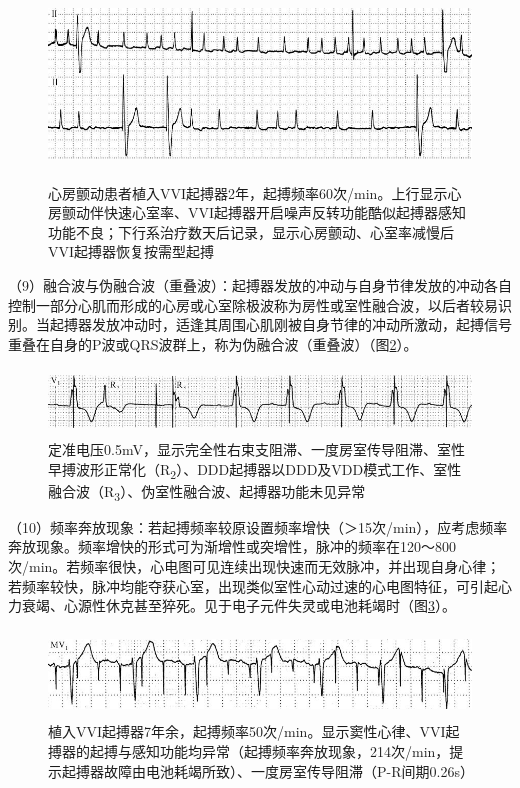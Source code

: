 \begin{figure}[!htbp]
 \centering
 \includegraphics[width=5.58333in,height=1.98958in]{./images/Image00609.jpg}
 \captionsetup{justification=centering}
 \caption{心房颤动患者植入VVI起搏器2年，起搏频率60次/min。上行显示心房颤动伴快速心室率、VVI起搏器开启噪声反转功能酷似起搏器感知功能不良；下行系治疗数天后记录，显示心房颤动、心室率减慢后VVI起搏器恢复按需型起搏}
 \label{fig38-6}
  \end{figure} 

（9）融合波与伪融合波（重叠波）：起搏器发放的冲动与自身节律发放的冲动各自控制一部分心肌而形成的心房或心室除极波称为房性或室性融合波，以后者较易识别。当起搏器发放冲动时，适逢其周围心肌刚被自身节律的冲动所激动，起搏信号重叠在自身的P波或QRS波群上，称为伪融合波（重叠波）（图\ref{fig38-7}）。

\begin{figure}[!htbp]
 \centering
 \includegraphics[width=5.58333in,height=0.69792in]{./images/Image00610.jpg}
 \captionsetup{justification=centering}
 \caption{定准电压0.5mV，显示完全性右束支阻滞、一度房室传导阻滞、室性早搏波形正常化（R\textsubscript{2}）、DDD起搏器以DDD及VDD模式工作、室性融合波（R\textsubscript{3}）、伪室性融合波、起搏器功能未见异常}
 \label{fig38-7}
  \end{figure} 


（10）频率奔放现象：若起搏频率较原设置频率增快（＞15次/min），应考虑频率奔放现象。频率增快的形式可为渐增性或突增性，脉冲的频率在120～800次/min。若频率很快，心电图可见连续出现快速而无效脉冲，并出现自身心律；若频率较快，脉冲均能夺获心室，出现类似室性心动过速的心电图特征，可引起心力衰竭、心源性休克甚至猝死。见于电子元件失灵或电池耗竭时（图\ref{fig38-8}）。

\begin{figure}[!htbp]
 \centering
 \includegraphics[width=5.58333in,height=0.91667in]{./images/Image00611.jpg}
 \captionsetup{justification=centering}
 \caption{植入VVI起搏器7年余，起搏频率50次/min。显示窦性心律、VVI起搏器的起搏与感知功能均异常（起搏频率奔放现象，214次/min，提示起搏器故障由电池耗竭所致）、一度房室传导阻滞（P-R间期0.26s）}
 \label{fig38-8}
  \end{figure} 

